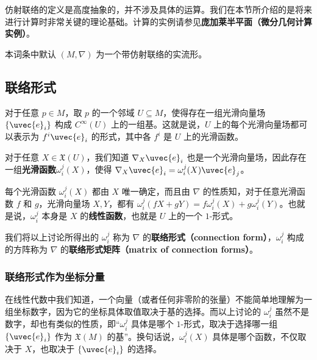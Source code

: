 



仿射联络的定义是高度抽象的，并不涉及具体的运算。我们在本节所介绍的是将来进行计算时非常关键的理论基础。计算的实例请参见\textbf{庞加莱半平面（微分几何计算实例）}。

本词条中默认 $(M, \nabla)$ 为一个带仿射联络的实流形。

\subsection{联络形式}

对于任意 $p\in M$，取 $p$ 的一个邻域 $U\subseteq M$，使得存在一组光滑向量场 $\{\uvec{e}_i\}$ 构成 $C^{\infty}(U)$ 上的一组基。这就是说，$U$ 上的每个光滑向量场都可以表示为 $f^i\uvec{e}_i$ 的形式，其中各 $f^i$ 是 $U$ 上的光滑函数。

对于任意 $X\in\mathfrak{X}(U)$，我们知道 $\nabla_X\uvec{e}_i$ 也是一个光滑向量场，因此存在一组\textbf{光滑函数}$\omega^j_i(X)$，使得 $\nabla_X\uvec{e}_i=\omega^j_i(X)\uvec{e}_j$。

每个光滑函数 $\omega^j_i(X)$ 都由 $X$ 唯一确定，而且由 $\nabla$ 的性质知，对于任意光滑函数 $f$ 和 $g$，光滑向量场 $X, Y$，都有 $\omega^j_i(fX+gY)=f\omega^j_i(X)+g\omega^j_i(Y)$。也就是说，$\omega^j_i$ 本身是 $X$ 的\textbf{线性函数}，也就是 $U$ 上的一个 $1$-形式。

我们将以上讨论所得出的 $\omega^j_i$ 称为 $\nabla$ 的\textbf{联络形式（connection form）}，$\omega^j_i$ 构成的方阵称为 $\nabla$ 的\textbf{联络形式矩阵（matrix of connection forms）}。

\subsubsection{联络形式作为坐标分量}

在线性代数中我们知道，一个向量（或者任何非零阶的张量）不能简单地理解为一组坐标数字，因为它的坐标具体取值取决于基的选择。而以上讨论的 $\omega^j_i$ 虽然不是数字，却也有类似的性质，即“$\omega^j_i$ 具体是哪个 $1$-形式，取决于选择哪一组 $\{\uvec{e}_i\}$ 作为 $\mathfrak{X}(M)$ 的基”。换句话说，$\omega^j_i(X)$ 具体是哪个函数，不仅取决于 $X$，也取决于 $\{\uvec{e}_i\}$ 的选择。

